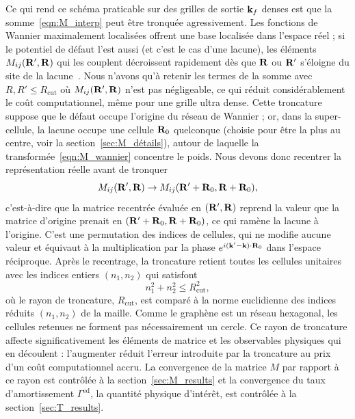 Ce qui rend ce schéma praticable sur des grilles de sortie $\mathbf{k}_f$ denses est que la somme~\eqref{eqn:M_interp} peut être tronquée agressivement. Les fonctions de Wannier maximalement localisées offrent une base localisée dans l'espace réel ; si le potentiel de défaut l'est aussi (et c'est le cas d'une lacune), les éléments $M_{ij}(\mathbf{R}',\mathbf{R})$ qui les couplent décroissent rapidement dès que $\mathbf{R}$ ou $\mathbf{R}'$ s'éloigne du site de la lacune~\cite{brouderExponentialLocalizationWannier2007,marzariMaximallyLocalizedWannier2012a}. Nous n'avons qu'à retenir les termes de la somme avec $R,R'\le R_\text{cut}$ où $M_{ij}(\mathbf{R}',\mathbf{R})$ n'est pas négligeable, ce qui réduit considérablement le coût computationnel, même pour une grille ultra dense. Cette troncature suppose que le défaut occupe l'origine du réseau de Wannier ; or, dans la super-cellule, la lacune occupe une cellule $\mathbf{R}_0$ quelconque (choisie pour être la plus au centre, voir la section~\ref{sec:M_détails}), autour de laquelle la transformée~\eqref{eqn:M_wannier} concentre le poids. Nous devons donc recentrer la représentation réelle avant de tronquer
\begin{equation}
    M_{ij}(\mathbf{R}',\mathbf{R})\to M_{ij}(\mathbf{R}'+\mathbf{R}_0,\mathbf{R}+\mathbf{R}_0),\label{eqn:M_recentrage}
\end{equation}
c'est-à-dire que la matrice recentrée évaluée en $(\mathbf{R}',\mathbf{R})$ reprend la valeur que la matrice d'origine prenait en $(\mathbf{R}'+\mathbf{R}_0,\mathbf{R}+\mathbf{R}_0)$, ce qui ramène la lacune à l'origine. C'est une permutation des indices de cellules, qui ne modifie aucune valeur et équivaut à la multiplication par la phase $e^{i(\mathbf{k}'-\mathbf{k})\cdot\mathbf{R}_0}$ dans l'espace réciproque. Après le recentrage, la troncature retient toutes les cellules unitaires avec les indices entiers $(n_1,n_2)$ qui satisfont
\begin{equation}
    n_1^2+n_2^2\le R_\text{cut}^2,
\end{equation}
où le rayon de troncature, $R_\text{cut}$, est comparé à la norme euclidienne des indices réduits $(n_1,n_2)$ de la maille. Comme le graphène est un réseau hexagonal, les cellules retenues ne forment pas nécessairement un cercle. Ce rayon de troncature affecte significativement les éléments de matrice et les observables physiques qui en découlent : l'augmenter réduit l'erreur introduite par la troncature au prix d'un coût computationnel accru. La convergence de la matrice $M$ par rapport à ce rayon est contrôlée à la section~\ref{sec:M_results} et la convergence du taux d'amortissement $\Gamma^\text{ed}$, la quantité physique d'intérêt, est contrôlée à la section~\ref{sec:T_results}.

